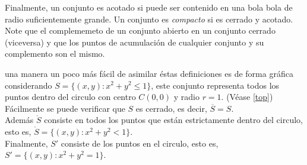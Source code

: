\medskip

Finalmente, un conjunto es acotado si puede ser contenido en una bola bola de radio suficientemente grande. Un conjunto es 
{\itshape compacto} si es cerrado y acotado. Note que el complememeto de un conjunto abierto en un conjunto cerrado (viceversa)
y que los puntos de acumulaci\'on de cualquier conjunto y su complemento son el mismo.\\

\medskip

una manera un poco m\'as f\'acil de asimilar \'estas definiciones es de forma gr\'afica considerando
$S = \{(x, y): x^2 + y^2 \leqslant 1\}$, este conjunto representa todos los puntos dentro del circulo con centro $C(0, 0)$ y 
radio $r=1$. (V\'ease \ref{top})\\

F\'acilmente se puede verificar que $S$ es cerrado, es decir, $\overline{S} = S$.\\
Adem\'as $\mathring{S}$ consiste en todos los puntos que est\'an estrictamente dentro del circulo, esto es,
$\mathring{S} = \{(x, y): x^2 + y^2 < 1 \}$.\\
Finalmente, $S'$ consiste de los puntos en el circulo, esto es, $S' = \{(x, y): x^2 + y^2 = 1\}$.

